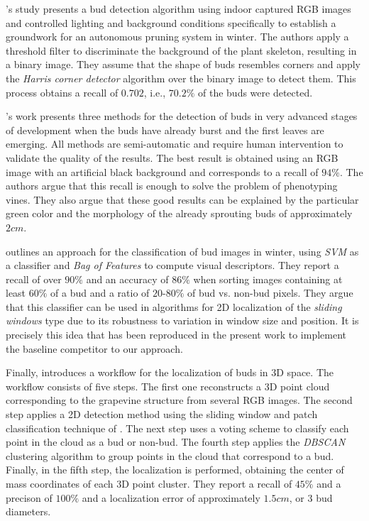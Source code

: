 \documentclass[a4paper,authoryear,review]{elsarticle}
\begin{document}
\citet{xu2014detection}’s study presents a bud detection algorithm using indoor captured RGB images and controlled lighting and background conditions specifically to establish a groundwork for an autonomous pruning system in winter. The authors apply a threshold filter to discriminate the background of the plant skeleton, resulting in a binary image. They assume that the shape of buds resembles corners and apply the \emph{Harris corner detector} algorithm over the binary image to detect them. This process obtains a recall of $0.702$, i.e., $70.2\%$ of the buds were detected. 

\citet{herzog2014initial}’s work presents three methods for  the detection of buds in very advanced stages of development when the buds have already burst and the first leaves are emerging. All methods are semi-automatic and require human intervention to validate the quality of the results. The best result is obtained using an RGB image with an artificial black background and corresponds to a recall of $94\%$. The authors argue that this recall is enough to solve the problem of phenotyping vines. They also argue that these good results can be explained by the particular green color and the morphology of the already sprouting buds of approximately $2cm$.  

\citet{perez2017image} outlines an approach for the classification of bud images in winter, using \emph{SVM} as a classifier and \emph{Bag of Features} to compute visual descriptors. They report a recall of over $90\%$ and an accuracy of $86\%$ when sorting images containing at least $60\%$ of a bud and a ratio of $20$-$80\%$ of bud vs. non-bud pixels. They argue that this classifier can be used in algorithms for 2D localization of the \emph{sliding windows} type due to its robustness to variation in window size and position. It is precisely this idea that has been reproduced in the present work to implement the baseline competitor to our approach.

Finally, \citet{diaz2018grapevine} introduces a workflow for the localization of buds in 3D space. The workflow consists of five steps. The first one reconstructs a 3D point cloud corresponding to the grapevine structure from several RGB images. The second step applies a 2D detection method using the sliding window and patch classification technique of \citet{perez2017image}. The next step uses a voting scheme to classify each point in the cloud as a bud or non-bud. The fourth step applies the \emph{DBSCAN} clustering algorithm to group points in the cloud that correspond to a bud. Finally, in the fifth step, the localization is performed, obtaining the center of mass coordinates of each 3D point cluster. They report a recall of $45\%$ and a precison of $100\%$ and a localization error of approximately $1.5cm$, or 3 bud diameters.  
\end{document}

